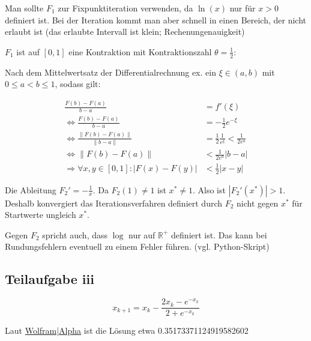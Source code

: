 Man sollte $F_1$ zur Fixpunktiteration verwenden, da $\ln(x)$ nur für
$x>0$ definiert ist. Bei der Iteration kommt man aber schnell in
einen Bereich, der nicht erlaubt ist (das erlaubte Intervall ist klein;
Rechenungenauigkeit)

$F_1$ ist auf $[0,1]$ eine Kontraktion mit Kontraktionszahl $\theta = \frac{1}{2}$:

Nach dem Mittelwertsatz der Differentialrechnung ex. ein $\xi \in (a,b)$ mit $ 0 \leq a < b \leq 1$, sodass
gilt:


\begin{align}
    \frac{F(b) - F(a)}{b-a} &= f'(\xi) \\
    \Leftrightarrow \frac{F(b) - F(a)}{b-a} &= - \frac{1}{2} e^{- \xi} \\
    \Leftrightarrow \frac{\|F(b) - F(a)\|}{\|b-a\|} &= \frac{1}{2} \frac{1}{e^{\xi}} < \frac{1}{2 e^a} \\
    \Leftrightarrow \|F(b) - F(a)\| &< \frac{1}{2 e^a} |b-a|\\
    \Rightarrow \forall x, y \in [0,1]: |F(x) - F(y)| &< \frac{1}{2} |x-y|
\end{align}

Die Ableitung $F_2' = -\frac{1}{x}$. Da $F_2(1) \neq 1$ ist $x^* \neq 1$.
Also ist $|F_2'(x^*)| > 1$. Deshalb konvergiert das Iterationsverfahren
definiert durch $F_2$ nicht gegen $x^*$ für Startwerte ungleich $x^*$.

Gegen $F_2$ spricht auch, dass $\log$ nur auf $\mathbb{R}^+$ definiert
ist. Das kann bei Rundungsfehlern eventuell zu einem Fehler führen.
(vgl. Python-Skript)

\subsection*{Teilaufgabe iii}
\[x_{k+1} = x_k - \frac{2x_k - e^{-x_k}}{2 + e^{-x_k}}\]

Laut \href{http://www.wolframalpha.com/input/?i=2x-e%5E(-x)%3D0}{Wolfram|Alpha} ist die Lösung etwa 0.35173371124919582602
